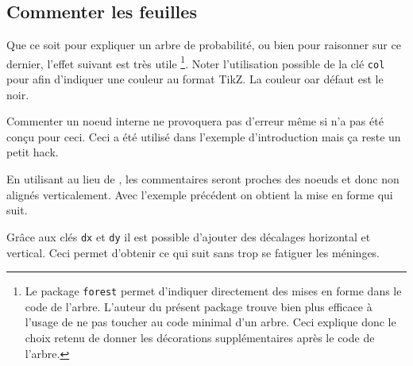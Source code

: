 \documentclass[12pt,a4paper]{article}
\begin{document}

\subsection{Commenter les feuilles}


Que ce soit pour expliquer un arbre de probabilité, ou bien pour raisonner sur ce dernier, l'effet suivant est très utile
\footnote{
	Le package \texttt{forest} permet d'indiquer directement des mises en forme dans le code de l'arbre.
	L'auteur du présent package trouve bien plus efficace à l'usage de ne pas toucher au code minimal d'un arbre.
	Ceci explique donc le choix retenu de donner les décorations supplémentaires après le code de l'arbre.
}.
Noter l'utilisation possible de la clé \verb#col# pour  afin d'indiquer une couleur au format TikZ.
La couleur oar défaut est le noir. 




\begin{remark}
	Commenter un noeud interne ne provoquera pas d'erreur même si  n'a pas été conçu pour ceci.
	Ceci a été utilisé dans l'exemple d'introduction mais ça reste un petit hack.
\end{remark}





En utilisant  au lieu de , les commentaires seront proches des noeuds et donc non alignés verticalement. 
Avec l'exemple précédent on obtient la mise en forme qui suit.

\medskip







Grâce aux clés \verb#dx# et \verb#dy# il est possible d'ajouter des décalages horizontal et vertical. Ceci permet d'obtenir ce qui suit sans trop se fatiguer les méninges.


\end{document}
